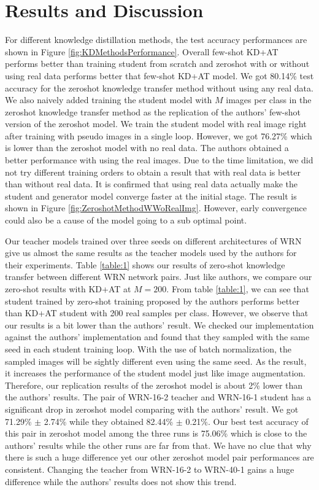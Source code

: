\documentclass{article}
\begin{document}
\section{Results and Discussion}
For different knowledge distillation methods, the test accuracy performances are shown in Figure \ref{fig:KDMethodsPerformance}. Overall few-shot KD+AT performs better than training student from scratch and zeroshot with or without using real data performs better that few-shot KD+AT model. We got 80.14\% test accuracy for the zeroshot knowledge transfer method without using any real data. We also naively added training the student model with $M$ images per class in the zeroshot knowledge transfer method as the replication of the authors' few-shot version of the zeroshot model. We train the student model with real image right after training with pseudo images in a single loop. However, we got 76.27\% which is lower than the zeroshot model with no real data. The authors obtained a better performance with using the real images. Due to the time limitation, we did not try different training orders to obtain a result that with real data is better than without real data. It is confirmed that using real data actually make the student and generator model converge faster at the initial stage. The result is shown in Figure \ref{fig:ZeroshotMethodWWoRealImg}. However, early convergence could also be a cause of the model going to a sub optimal point.

Our teacher models trained over three seeds on different architectures of WRN\cite{zagoruyko2016wide} give us almost the same results as the teacher models used by the authors for their experiments. Table \ref{table:1} shows our results of zero-shot knowledge transfer between different WRN network pairs. Just like authors, we compare our zero-shot results with KD+AT at $M=200$. From table \ref{table:1}, we can see that student trained by zero-shot training proposed by the authors performs better than KD+AT student with 200 real samples per class. However, we observe that our results is a bit lower than the authors' result. We checked our implementation against the authors' implementation and found that they sampled with the same seed in each student training loop. With the use of batch normalization, the sampled images will be sightly different even using the same seed. As the result, it increases the performance of the student model just like image augmentation. Therefore, our replication results of the zeroshot model is about 2\% lower than the authors' results.
The pair of WRN-16-2 teacher and WRN-16-1 student has a significant drop in zeroshot model comparing with the authors' result. We got 71.29\% $\pm$ 2.74\% while they obtained 82.44\% $\pm$ 0.21\%. Our best test accuracy of this pair in zeroshot model among the three runs is 75.06\% which is close to the authors' results while the other runs are far from that. We have no clue that why there is such a huge difference yet our other zeroshot model pair performances are consistent. Changing the teacher from WRN-16-2 to WRN-40-1 gains a huge difference while the authors' results does not show this trend.
\end{document}
